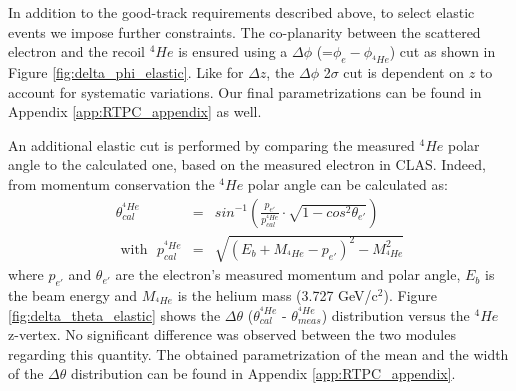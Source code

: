  In addition to the good-track requirements described above, to select elastic events we impose further constraints. The co-planarity between the scattered electron and the recoil $^4He$ is ensured using a $\Delta \phi$ (=$\phi_{e}-\phi_{^{4}He}$) cut as shown in Figure \ref{fig:delta_phi_elastic}. Like for $\Delta z$, the $\Delta \phi$ 2$\sigma$ cut is dependent on $z$ to account for systematic variations. Our final parametrizations can be found in Appendix \ref{app:RTPC_appendix} as well.

An additional elastic cut is performed by comparing the measured $^4He$ polar angle to the calculated one, based on the measured electron in CLAS. Indeed, from momentum conservation the $^4He$ polar angle can be calculated as:
\begin{eqnarray}
\theta^{^4He}_{cal} &=&  sin^{-1}\left(\frac{p_{e'}}{p^{^4He}_{cal}} \cdot \sqrt{1-cos^{2}\theta_{e'}}\right) \\
\text{ with~~} p^{^4He}_{cal} &=& \sqrt{(E_{b} + M_{^4He} - p_{e'})^{2} - M^{2}_{^4He}}
\label{equ:theta_helium}
\end{eqnarray}
where $p_{e'}$ and $\theta_{e'}$ are the electron's measured momentum and polar angle, $E_{b}$ is the beam energy and $M_{^4He}$ is the helium mass (3.727 GeV/c$^{2}$). Figure \ref{fig:delta_theta_elastic} shows the $\Delta \theta$ ($\theta^{^4He}_{cal}$ - $\theta^{^4He}_{meas}$) distribution versus the $^4He$ z-vertex. No significant difference was observed between the two modules regarding this quantity. The obtained parametrization of the mean and the width of the $\Delta \theta$  distribution can be found in Appendix \ref{app:RTPC_appendix}.


